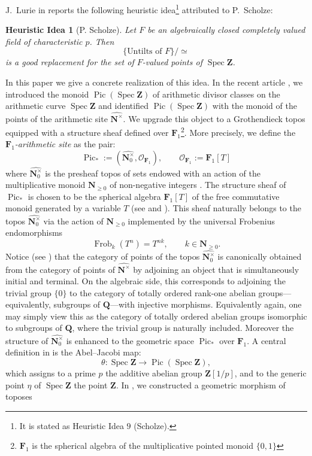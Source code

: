 \documentclass[11pt,a4paper]{article}
\newtheorem*{heuristic}{Heuristic Idea}
\newcommand{\N}{\mathbf{N}}
\newcommand{\Q}{\mathbf{Q}}
\newcommand{\Z}{\mathbf{Z}}
\newcommand{\cO}{\mathcal O}
\newcommand{\Fone}{\mathbf{F}_{1}}
\def\spz{\Spec \Z}
\newcommand{\nat}{\widehat{\N^\times}}
\newcommand{\nato}{\widehat{\N^\times_0}}
\newcommand{\nto}{{\N_{\geq 0}}}
\newcommand{\Spec}{\operatorname{Spec}}
\newcommand{\Pic}{\operatorname{Pic}} \newcommand{\Jac}{\operatorname{Jac}}
\newcommand{\picone}{{\Pic}_{*}}
\begin{document}
J.~Lurie in  \cite{Lurie} reports the following heuristic idea\footnote{It is stated  as Heuristic Idea $9$ (Scholze).} attributed to P.~Scholze:
\begin{heuristic}[P. Scholze]
 Let $F$ be an algebraically closed completely valued field of characteristic $p$. Then
$$
\{\text{Untilts of } F\} / \simeq
$$
is a good replacement for the set of $F$-valued points of $\spz$. 
\end{heuristic}
In this paper we give a concrete realization of this idea.
In the recent article \cite{CC6}, we introduced the monoid $\Pic(\spz)$ of arithmetic divisor classes on the arithmetic curve $\spz$ and identified $\Pic(\spz)$   with the monoid of the points of the arithmetic site $\nat$. We upgrade this object  to a Grothendieck topos equipped with a structure sheaf defined over $\Fone$\footnote{$\Fone$ is the spherical algebra of the multiplicative pointed monoid $\{0,1\}$}.
More precisely, we define the \emph{$\Fone$-arithmetic site} as the pair:
\[
\picone := (\nato, \cO_{\Fone}),\qquad \cO_{\Fone}:=\Fone[T]
\]
where $\nato$ is the presheaf topos of sets endowed with an action of the multiplicative monoid $\nto$ of non-negative integers \cite{CC1}. The structure sheaf of $\picone$ is chosen to be the spherical algebra $\Fone[T]$  of the free commutative monoid generated by a variable $T$ (see \cite{CC2} and \cite{Xu}). This sheaf naturally belongs to the topos $\nato$ via the action of $\nto$ implemented by the universal Frobenius endomorphisms
\[
\operatorname{Frob}_k(T^n) = T^{nk}, \qquad k \in \N_{\geq 0}.
\]
Notice (see \cite[\S 2.3]{CC1}) that the category of points of the topos $\nato$ is canonically obtained from the category of points of $\nat$ by adjoining an object that is simultaneously initial and terminal. On the algebraic side, this corresponds to adjoining the trivial group $\{0\}$ to
 the category of totally ordered rank-one abelian groups—equivalently, subgroups of $\Q$—with injective morphisms. Equivalently again, one may simply view this as the category of totally ordered abelian groups isomorphic to subgroups of $\Q$, where the trivial group is naturally included.  Moreover the structure of $\nato$ is enhanced to the  geometric space $\picone$ over $\Fone$.\newline
A central definition in \cite{CC6} is the Abel–Jacobi map:
\begin{equation}\label{spzmap}
\theta: \spz \longrightarrow \Pic(\spz),
\end{equation}
which assigns to a prime $p$ the additive abelian group $\Z[1/p]$,  and to the generic point $\eta$ of $\spz$ the point $\Z$. In \cite[Theorem 5.3]{CC1}, we constructed a geometric morphism of toposes
\end{document}
